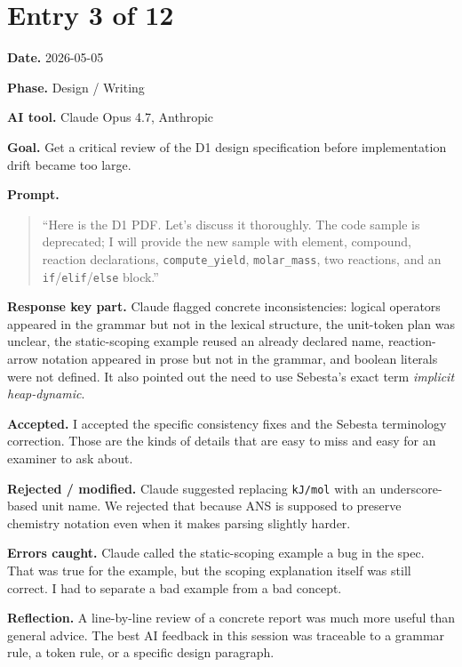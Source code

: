 \documentclass[11pt,a4paper]{article}
\newcommand{\code}[1]{\texttt{#1}}
\newcommand{\field}[2]{\textbf{#1.} #2\par}
\newcommand{\prompt}[1]{%
  \textbf{Prompt.}
  \begin{quote}\small #1\end{quote}
}
\begin{document}
\section{Entry 3 of 12}
\field{Date}{2026-05-05}
\field{Phase}{Design / Writing}
\field{AI tool}{Claude Opus 4.7, Anthropic}
\field{Goal}{Get a critical review of the D1 design specification before implementation drift became too large.}
\prompt{``Here is the D1 PDF. Let's discuss it thoroughly. The code sample is deprecated; I will provide the new sample with element, compound, reaction declarations, \code{compute\_yield}, \code{molar\_mass}, two reactions, and an \code{if}/\code{elif}/\code{else} block.''}
\field{Response key part}{Claude flagged concrete inconsistencies: logical operators appeared in the grammar but not in the lexical structure, the unit-token plan was unclear, the static-scoping example reused an already declared name, reaction-arrow notation appeared in prose but not in the grammar, and boolean literals were not defined. It also pointed out the need to use Sebesta's exact term \textit{implicit heap-dynamic}.}
\field{Accepted}{I accepted the specific consistency fixes and the Sebesta terminology correction. Those are the kinds of details that are easy to miss and easy for an examiner to ask about.}
\field{Rejected / modified}{Claude suggested replacing \code{kJ/mol} with an underscore-based unit name. We rejected that because ANS is supposed to preserve chemistry notation even when it makes parsing slightly harder.}
\field{Errors caught}{Claude called the static-scoping example a bug in the spec. That was true for the example, but the scoping explanation itself was still correct. I had to separate a bad example from a bad concept.}
\field{Reflection}{A line-by-line review of a concrete report was much more useful than general advice. The best AI feedback in this session was traceable to a grammar rule, a token rule, or a specific design paragraph.}
\end{document}
